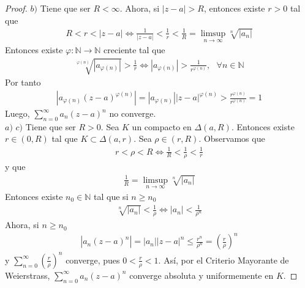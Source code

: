 \begin{proof}
$b)$ Tiene que ser $R < \infty$. Ahora, si $|z-a| > R$, entonces existe $r > 0$ tal que
\begin{align*}
    R < r < |z-a| \Longleftrightarrow \frac{1}{|z-a|} < \frac{1}{r} < \frac{1}{R} = \limsup_{n \to \infty}{\sqrt[n]{|a_n|}}
\end{align*}
Entonces existe $\varphi : \mathbb{N} \longrightarrow \mathbb{N}$ creciente tal que 
\begin{align*}
    \sqrt[\varphi(n)]{\left|a_{\varphi(n)}\right|} > \frac{1}{r} \Longleftrightarrow \left|a_{\varphi(n)}\right| > \frac{1}{r^{\varphi(n)}}, \ \ \ \forall n \in \mathbb{N}
\end{align*}
Por tanto
\begin{align*}
    \left| a_{\varphi(n)}(z-a)^{\varphi(n)} \right| = \left| a_{\varphi(n)}\right|\left| z-a \right|^{\varphi(n)} > \frac{r^{\varphi(n)}}{r^{\varphi(n)}} = 1
\end{align*}
Luego, $\sum_{n=0}^{\infty}{a_n(z-a)^n}$ no converge.
\\
\newline
$a)$  $c)$ Tiene que ser $R > 0$. Sea $K$ un compacto en $\Delta(a,R)$. Entonces existe $r \in (0,R)$ tal que $K \subset \Delta(a,r)$. Sea $\rho \in (r,R)$. Observamos que
\begin{align*}
    r < \rho < R \Longleftrightarrow \frac{1}{R} < \frac{1}{\rho} < \frac{1}{r}
\end{align*}
y que
\begin{align*}
    \frac{1}{R} = \limsup_{n \to \infty}{\sqrt[n]{|a_n|}}
\end{align*}
Entonces existe $n_0 \in \mathbb{N}$ tal que si $n \ge n_0$
\begin{align*}
    \sqrt[n]{|a_n|} < \frac{1}{\rho} \Longleftrightarrow |a_n| < \frac{1}{\rho^n}
\end{align*}
Ahora, si $n \ge n_0$
\begin{align*}
    \left| a_n(z-a)^n \right| = \left| a_n \right| \left| z-a \right|^n \leq \frac{r^n}{\rho^n} = \left( \frac{r}{\rho} \right)^n
\end{align*}
y $\sum_{n=0}^{\infty}{\left( \frac{r}{\rho} \right)^n}$ converge, pues $0 <  \frac{r}{\rho} < 1$. Así, por el Criterio Mayorante de Weierstrass,  $\sum_{n=0}^{\infty}{a_n(z-a)^n}$ converge absoluta y uniformemente en $K$.
\end{proof}

